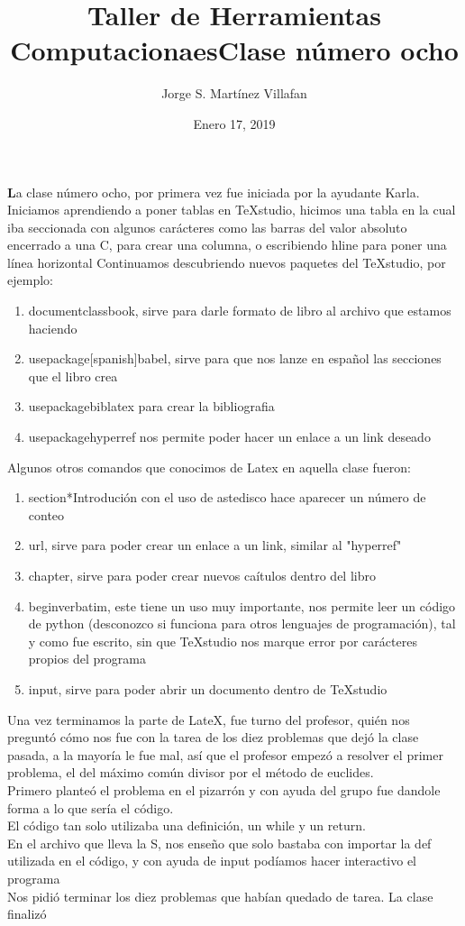 \documentclass[letterpaper, 12pt, oneside]{article}%
\title{\Huge Taller de Herramientas Computacionaes}
\author{Jorge S. Martínez Villafan}
\date{Enero 17, 2019}
\begin{document}
\maketitle
\newpage
\title{Clase número ocho}

\textbf La clase número ocho, por primera vez fue iniciada por la ayudante Karla. Iniciamos aprendiendo a poner tablas en TeXstudio, hicimos una tabla en la cual iba seccionada con algunos carácteres como las barras del valor absoluto encerrado a una C, para crear una columna, o escribiendo hline para poner una línea horizontal
Continuamos descubriendo nuevos paquetes del TeXstudio, por ejemplo:
\begin{enumerate}
\item documentclass{book}, sirve para darle formato de libro al archivo que estamos haciendo
\item usepackage[spanish]{babel}, sirve para que nos lanze en español las secciones que el libro crea
\item usepackage{biblatex} para crear la bibliografia
\item usepackage{hyperref} nos permite poder hacer un enlace a un link deseado
\end{enumerate}
Algunos otros comandos que conocimos de Latex en aquella clase fueron: 
\begin{enumerate}
	\item section*{Introdución} con el uso de astedisco hace aparecer un número de conteo
	\item url, sirve para poder crear un enlace a un link, similar al "hyperref"
	\item chapter, sirve para poder crear nuevos caítulos dentro del libro
	\item begin{verbatim}, este tiene un uso muy importante, nos permite leer un código de python (desconozco si funciona para otros lenguajes de programación), tal y como fue escrito, sin que TeXstudio nos marque error por carácteres propios del programa
	\item input, sirve para poder abrir un documento dentro de TeXstudio
\end{enumerate}
Una vez terminamos la parte de LateX, fue turno del profesor, quién nos preguntó cómo nos fue con la tarea de los diez problemas que dejó la clase pasada, a la mayoría le fue mal, así que el profesor empezó a resolver el primer problema, el del máximo común divisor por el método de euclides.\\
Primero planteó el problema en el pizarrón y con ayuda del grupo fue dandole forma a lo que sería el código. \\
El código tan solo utilizaba una definición, un while y un return.\\
En el archivo que lleva la S, nos enseño que solo bastaba con importar la def utilizada en el código, y con ayuda de input podíamos hacer interactivo el programa\\

Nos pidió terminar los diez problemas que habían quedado de tarea.
La clase finalizó
\end{document}
